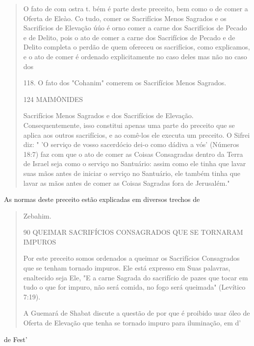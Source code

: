 \begin{quote}
O fato de com ostra t. bém é parte deste preceito, bem como o de comer a
Oferta de Eleào. Co tudo, comer os Sacrifícios Menos Sagrados e os
Sacrifícios de Elevação úúo é orno comer a carne dos Sacrifícios de
Peca­do e de Delito, pois o ato de comer a carne dos Sacrifícios de
Pecado e de Deli­to completa o perdão de quem ofereceu os sacrifícios,
como explicamos, e o ato de comer é ordenado explicitamente no caso
deles mas não no caso dos

118. O fato dos "Cohanim" comerem os Sacrifícios Menos Sagrados.

124 MAIMÔNIDES

Sacrifícios Menos Sagrados e dos Sacrifícios de Elevação.
Consequentemente, isso constitui apenas uma parte do preceito que se
aplica aos outros sacrifícios, e ao comê-los ele executa um preceito. O
Sifrei diz: " 'O serviço de vosso sa­cerdócio dei-o como dádiva a vós'
(Números 18:7) faz com que o ato de comer as Coisas Consagradas dentro
da Terra de Israel seja como o serviço no Santuá­rio: assim como ele
tinha que lavar suas mãos antes de iniciar o serviço no San­tuário, ele
também tinha que lavar as mãos antes de comer as Coisas Sagradas fora de
Jerusalém."
\end{quote}

As normas deste preceito estão explicadas em diversos trechos de

\begin{quote}
Zebahim.

90 QUEIMAR SACRIFÍCIOS CONSAGRADOS QUE SE TORNARAM IMPUROS

Por este preceito somos ordenados a queimar os Sacrifícios Consa­grados
que se tenham tornado impuros. Ele está expresso em Suas palavras,
enaltecido seja Ele, "E a carne Sagrada do sacrifício de pazes que tocar
em tudo o que for impuro, não será comida, no fogo será queimada"
(Levítico 7:19).

A Guemará de Shabat discute a questão de por que é proibido usar óleo de
Oferta de Elevação que tenha se tornado impuro para iluminação, em d'
\end{quote}

de Fest'

